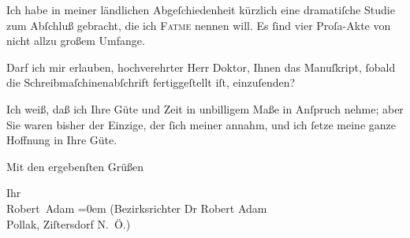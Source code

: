 \pstart
           Ich habe in meiner ländlichen Abgeſchiedenheit kürzlich eine dramatiſche Studie zum
               Abſchluß gebracht, die ich \textsc{Fatme} nennen will. Es{ }ſind vier Proſa-Akte von nicht allzu großem Umfange.\pend
           
\pstart
           {\pb}Darf ich mir erlauben, hochverehrter Herr Doktor,
               Ihnen das Manuſkript,{ }ſobald die Schreibmaſchinenabſchrift fertiggeſtellt iſt,
               einzuſenden?\pend
           
\pstart
           Ich weiß, daß ich Ihre Güte und Zeit in unbilligem Maße in Anſpruch nehme; aber Sie
               waren bisher der Einzige, der{ }ſich meiner annahm, und ich{ }ſetze meine ganze Hoffnung
               in Ihre Güte.\pend
           
\pstart
           Mit den ergebenſten Grüßen\pend
           
\pstart
           Ihr{\\[\baselineskip]}\spacefill\mbox{Robert Adam}\pend
           \leftskip=0em{}
\pstart
           \noindent{}\raggedleft{}(Bezirksrichter Dr Robert Adam{\\}Pollak, Ziſtersdorf{ }\textsc{N. Ö.})\pend
           \endnumbering{}  \newcommand{\dateiname}{L02117}\newcommand{\titel}{Robert Adam an Arthur Schnitzler, 2. 4. 1913}\newcommand{\editorInnen}{Martin Anton Müller und Gerd-Hermann Susen}
